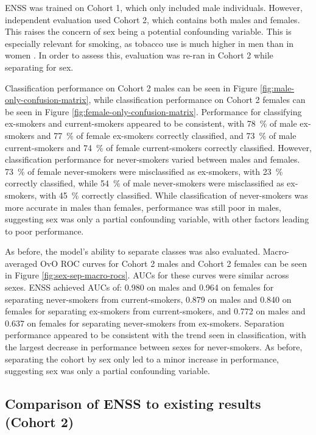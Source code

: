 \documentclass{article} %
\begin{document}
ENSS was trained on Cohort 1, which only included male individuals. However, independent evaluation used Cohort 2, which contains both males and females. This raises the concern of sex being a potential confounding variable. This is especially relevant for smoking, as tobacco use is much higher in men than in women \cite{WHO2021Tobacco}. In order to assess this, evaluation was re-ran in Cohort 2 while separating for sex.

Classification performance on Cohort 2 males can be seen in Figure \ref{fig:male-only-confusion-matrix}, while classification performance on Cohort 2 females can be seen in Figure \ref{fig:female-only-confusion-matrix}. Performance for classifying ex-smokers and current-smokers appeared to be consistent, with \SI{78}{\percent} of male ex-smokers and \SI{77}{\percent} of female ex-smokers correctly classified, and \SI{73}{\percent} of male current-smokers and \SI{74}{\percent} of female current-smokers correctly classified. However, classification performance for never-smokers varied between males and females. \SI{73}{\percent} of female never-smokers were misclassified as ex-smokers, with \SI{23}{\percent} correctly classified, while \SI{54}{\percent} of male never-smokers were misclassified as ex-smokers, with \SI{45}{\percent} correctly classified. While classification of never-smokers was more accurate in males than females, performance was still poor in males, suggesting sex was only a partial confounding variable, with other factors leading to poor performance.

As before, the model's ability to separate classes was also evaluated. Macro-averaged OvO ROC curves for Cohort 2 males and Cohort 2 females can be seen in Figure \ref{fig:sex-sep-macro-rocs}. AUCs for these curves were similar across sexes. 
ENSS achieved AUCs of: 0.980 on males and 0.964 on females for separating never-smokers from current-smokers, 0.879 on males and 0.840 on females for separating ex-smokers from current-smokers, and 0.772 on males and 0.637 on females for separating never-smokers from ex-smokers. Separation performance appeared to be consistent with the trend seen in classification, with the largest decrease in performance between sexes for never-smokers. As before, separating the cohort by sex only led to a minor increase in performance, suggesting sex was only a partial confounding variable. 

\subsection{Comparison of ENSS to existing results (Cohort 2)} \label{sec:model-comparisons}
\end{document}
